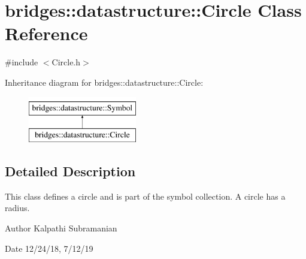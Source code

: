 \hypertarget{classbridges_1_1datastructure_1_1_circle}{}\section{bridges\+:\+:datastructure\+:\+:Circle Class Reference}
\label{classbridges_1_1datastructure_1_1_circle}


{\ttfamily \#include $<$Circle.\+h$>$}

Inheritance diagram for bridges\+:\+:datastructure\+:\+:Circle\+:\begin{figure}[H]
\begin{center}
\leavevmode
\includegraphics[height=2.000000cm]{classbridges_1_1datastructure_1_1_circle}
\end{center}
\end{figure}


\subsection{Detailed Description}
This class defines a circle and is part of the symbol collection. A circle has a radius. 

\begin{DoxyAuthor}{Author}
Kalpathi Subramanian 
\end{DoxyAuthor}
\begin{DoxyDate}{Date}
12/24/18, 7/12/19 
\end{DoxyDate}
